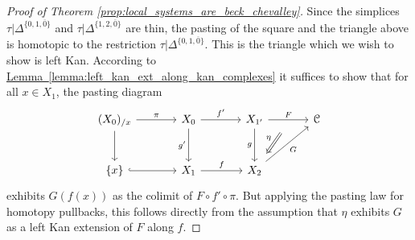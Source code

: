 \documentclass[main.tex]{subfiles}
\begin{document}
\begin{proof}[Proof of Theorem \ref{prop:local_systems_are_beck_chevalley}]
  Since the simplices $\tau|\Delta^{\{0,1,\overline{0}\}}$ and $\tau|\Delta^{\{1,2, \overline{0}\}}$ are thin, the pasting of the square and the triangle above is homotopic to the restriction $\tau|\Delta^{\{0,1,\overline{0}\}}$. This is the triangle which we wish to show is left Kan. According to \hyperref[lemma:left_kan_ext_along_kan_complexes]{Lemma~\ref*{lemma:left_kan_ext_along_kan_complexes}} it suffices to show that for all $x \in X_{1}$, the pasting diagram
  \begin{equation*}
    \begin{tikzcd}[row sep=large, column sep=large]
      (X_{0})_{/x}
      \arrow[r, "\pi"]
      \arrow[d]
      & X_{0}
      \arrow[r, "f'"]
      \arrow[d, swap, "g'"]
      & X_{1'}
      \arrow[d, swap, "g"]
      \arrow[r, "F", ""{swap, name=M}]
      & \category{C}
      \\
      \{x\}
      \arrow[r, hook]
      & X_{1}
      \arrow[r, "f"]
      & X_{2}
      \arrow[ur, swap, "G"]
      \arrow[from=M, Rightarrow, shorten=2ex, swap, "\eta"]
    \end{tikzcd}
  \end{equation*}
  exhibits $G(f(x))$ as the colimit of $F \circ f' \circ \pi$. But applying the pasting law for homotopy pullbacks, this follows directly from the assumption that $\eta$ exhibits $G$ as a left Kan extension of $F$ along $f$.
\end{proof}
\end{document}
